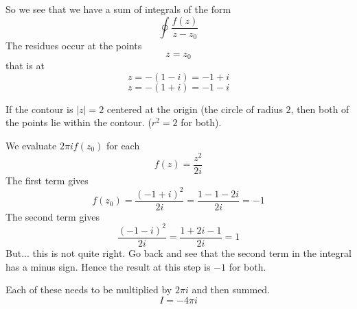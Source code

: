 \documentclass[11pt, oneside]{article}
\begin{document}
So we see that we have a sum of integrals of the form
\[ \oint \frac{f(z)}{z - z_0} \]
The residues occur at the points
\[ z = z_0 \]
that is at 
\[ z = - (1 - i) = -1 + i \]
\[ z = - (1 + i) = -1 - i \]

If the contour is $|z| = 2$ centered at the origin (the circle of radius $2$, then both of the points lie within the contour.  ($ r^2 = 2$ for both).

We evaluate $2 \pi i f(z_0)$ for each
\[ f(z) = \frac{z^2}{2i} \]
The first term gives
\[ f(z_0) = \frac{(-1 + i)^2}{2i} =  \frac{1 - 1 - 2i}{2i} = -1 \]
The second term gives 
\[ \frac{(-1 -i)^2}{2i} = \frac{1 + 2i - 1}{2i} = 1 \]
But...  this is not quite right.  Go back and see that the second term in the integral has a minus sign.  Hence the result at this step is $-1$ for both.

Each of these needs to be multiplied by $2 \pi i$ and then summed.
\[ I = -4 \pi i \]
\end{document}
